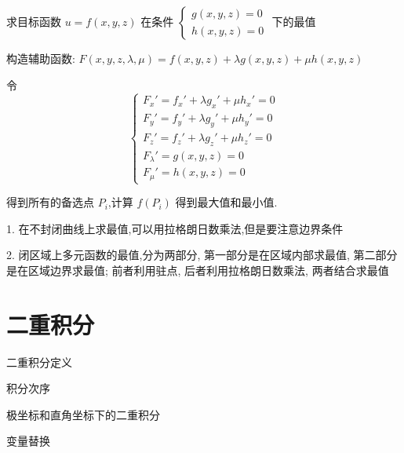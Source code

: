 \begin{definition}[拉格朗日数乘法]
	
	求目标函数 $u=f(x,y,z)$ 在条件 $\begin{cases}g(x,y,z)=0\\h(x,y,z)=0\end{cases}$ 下的最值
	
	构造辅助函数:  $F(x,y,z,\lambda,\mu)=f(x,y,z)+\lambda g(x,y,z)+\mu h(x,y,z)$
	
	令 $$\begin{cases} F_{x}'=f_{x}'+\lambda g_{x}'+\mu h_{x}'=0\\
		F_{y}'=f_{y}'+\lambda g_{y}'+\mu h_{y}'=0\\
		F_{z}'=f_{z}'+\lambda g_{z}'+\mu h_{z}'=0\\
		F_{\lambda}'= g(x,y,z)=0\\
		F_{\mu}'= h(x,y,z)=0
	\end{cases}$$
	
	得到所有的备选点 $P_{i}$,计算 $f(P_{i})$ 得到最大值和最小值.
\end{definition}
\begin{anymark}[注]
	1. 在不封闭曲线上求最值,可以用拉格朗日数乘法,但是要注意边界条件

	2. 闭区域上多元函数的最值,分为两部分, 第一部分是在区域内部求最值, 第二部分是在区域边界求最值; 前者利用驻点, 后者利用拉格朗日数乘法, 两者结合求最值
\end{anymark}



\chapter{二重积分}
\begin{introduction}
	\item 二重积分定义
	\item 积分次序
	\item 极坐标和直角坐标下的二重积分
	\item 变量替换
\end{introduction}

